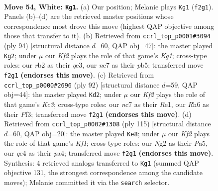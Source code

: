 \documentclass[11pt]{article}
\begin{document}
\clearpage

\begin{figure}[p]\centering
\begin{subfigure}{0.46\textwidth}\centering
\resizebox{\linewidth}{!}{%
\newchessgame
\chessboard[
  setfen={6k1/2n2pb1/7R/3P2R1/4q3/8/1r3KN1/8 w - - 4 54},
  showmover=false,
  pgfstyle=straightmove, color=movearrow, markmove={f2-g1}
]}
\caption{}
\end{subfigure}\hfill
\begin{subfigure}{0.46\textwidth}\centering
\resizebox{\linewidth}{!}{%
\newchessgame
\chessboard[
  setfen={8/3R1pk1/R3P1p1/1p6/8/4q3/8/6K1 w - - 2 48},
  showmover=false,
  pgfstyle=straightmove, color=movearrow, markmove={g1-g2}
]}
\caption{}
\end{subfigure}
\\[4pt]
\begin{subfigure}{0.46\textwidth}\centering
\resizebox{\linewidth}{!}{%
\newchessgame
\chessboard[
  setfen={8/8/2p2k2/3bp2R/7P/r1K2P2/8/4R3 w - - 16 47},
  showmover=false,
  pgfstyle=straightmove, color=movearrow, markmove={c3-d2}
]}
\caption{}
\end{subfigure}\hfill
\begin{subfigure}{0.46\textwidth}\centering
\resizebox{\linewidth}{!}{%
\newchessgame
\chessboard[
  setfen={5k2/1p3R2/1r2B3/p2P3r/P2K4/3P4/8/8 b - - 15 58},
  showmover=false,
  pgfstyle=straightmove, color=movearrow, markmove={f8-e8}
]}
\caption{}
\end{subfigure}
\caption{\textbf{Move 54, White: \texttt{Kg1}.} (a) Our position; Melanie plays \texttt{Kg1} (\texttt{f2g1}). Panels (b)--(d) are the retrieved master positions whose correspondence most drove this move (highest QAP objective among those that transfer to it). (b) Retrieved from \texttt{ccrl\_top\_p0001\#3094} (ply 94) [structural distance $d$=60, QAP obj=47]: the master played \texttt{Kg2}; under $\mu$ our \emph{Kf2} plays the role of that game's \emph{Kg1}; cross-type roles: our \emph{r}b2 as their \emph{q}e3, our \emph{n}c7 as their \emph{p}b5; transferred move \texttt{f2g1} \textbf{(endorses this move)}. (c) Retrieved from \texttt{ccrl\_top\_p0000\#2696} (ply 92) [structural distance $d$=59, QAP obj=44]: the master played \texttt{Kd2}; under $\mu$ our \emph{Kf2} plays the role of that game's \emph{Kc3}; cross-type roles: our \emph{n}c7 as their \emph{R}e1, our \emph{R}h6 as their \emph{P}f3; transferred move \texttt{f2g1} \textbf{(endorses this move)}. (d) Retrieved from \texttt{ccrl\_top\_p0002\#1308} (ply 115) [structural distance $d$=60, QAP obj=20]: the master played \texttt{Ke8}; under $\mu$ our \emph{Kf2} plays the role of that game's \emph{Kf1}; cross-type roles: our \emph{N}g2 as their \emph{P}a5, our \emph{q}e4 as their \emph{p}a4; transferred move \texttt{f2g1} \textbf{(endorses this move)}. Synthesis: 4 retrieved analogs transferred to \texttt{Kg1} (summed QAP objective 131, the strongest correspondence among the candidate moves); Melanie committed it via the \texttt{search} selector.}
\label{fig:thought-m106}
\end{figure}
\end{document}
